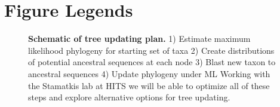 \documentclass[10pt]{article}
\begin{document}
%


\section*{Figure Legends}
\begin{figure}[!ht]
\begin{center}
\end{center}
\caption{
{\bf Schematic of tree updating plan. 
}  1) Estimate maximum likelihood phylogeny for starting set of taxa 2) Create distributions of potential ancestral sequences at each node 3) Blast new taxon to ancestral sequences 4) Update phylogeny under ML Working with the Stamatkis lab at HITS we will be able to optimize all of these steps and explore alternative options for tree updating.
}
\label{Figure_label}
\end{figure}
\end{document}
